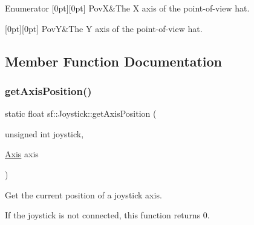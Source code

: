 \begin{DoxyEnumFields}{Enumerator}
[0pt][0pt]{}\mbox{\label{classsf_1_1_joystick_a48db337092c2e263774f94de6d50baa7a06420f7714e4dfd8b841885a0b5f3954}} 
PovX&The X axis of the point-\/of-\/view hat. \\
\hline

[0pt][0pt]{}\mbox{\label{classsf_1_1_joystick_a48db337092c2e263774f94de6d50baa7a0f8ffb2dcddf91b98ab910a4f8327ad9}} 
PovY&The Y axis of the point-\/of-\/view hat. \\
\hline

\end{DoxyEnumFields}


\subsection{Member Function Documentation}
\mbox{\label{classsf_1_1_joystick_aea4930193331df1851b709f3060ba58b}} 
\subsubsection{\texorpdfstring{getAxisPosition()}{getAxisPosition()}}
{\footnotesize\ttfamily static float sf\+::\+Joystick\+::get\+Axis\+Position (\begin{DoxyParamCaption}\item[{unsigned int}]{joystick,  }\item[{\mbox{\hyperlink{classsf_1_1_joystick_a48db337092c2e263774f94de6d50baa7}{Axis}}}]{axis }\end{DoxyParamCaption})\hspace{0.3cm}{\ttfamily [static]}}



Get the current position of a joystick axis. 

If the joystick is not connected, this function returns 0.


